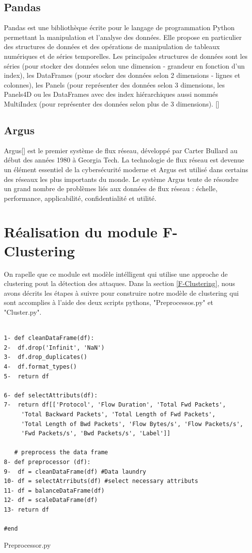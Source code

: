 \subsection{Pandas}
Pandas est une bibliothèque écrite pour le langage de programmation Python permettant la manipulation et l'analyse des données. Elle propose en particulier des structures de données et des opérations de manipulation de tableaux numériques et de séries temporelles. Les principales structures de données sont les séries (pour stocker des données selon une dimension - grandeur en fonction d'un index), les DataFrames (pour stocker des données selon 2 dimensions - lignes et colonnes), les Panels (pour représenter des données selon 3 dimensions, les Panels4D ou les DataFrames avec des index hiérarchiques aussi nommés MultiIndex (pour représenter des données selon plus de 3 dimensions). [\cite{30}]

\subsection{Argus}
Argus[\cite{31}] est le premier système de flux réseau, développé par Carter Bullard au début des années 1980 à Georgia Tech. La technologie de flux réseau est devenue un élément essentiel de la cybersécurité moderne et Argus est utilisé dans certains des réseaux les plus importants du monde. Le système Argus tente de résoudre un grand nombre de problèmes liés aux données de flux réseau : échelle, performance, applicabilité, confidentialité et utilité.\\

\section{Réalisation du module F-Clustering}
On rapelle que ce module est modèle intélligent qui utilise une approche de clustering pout la détection des attaques. Dans la section \ref{F-Clustering}, nous avons décrits les étapes à suivre pour construire notre modèle de clustering qui sont accomplies à l'aide des deux scripts pythons, "Preprocessos.py" et "Cluster.py".
\begin{algorithm}[H]
\begin{verbatim}

1- def cleanDataFrame(df):
2-  df.drop('Infinit', 'NaN')
3-  df.drop_duplicates()
4-  df.format_types()
5-  return df

6- def selectAttributs(df):
7-  return df[['Protocol', 'Flow Duration', 'Total Fwd Packets',
     'Total Backward Packets', 'Total Length of Fwd Packets',	
     'Total Length of Bwd Packets', 'Flow Bytes/s', 'Flow Packets/s', 
     'Fwd Packets/s', 'Bwd Packets/s', 'Label']]
	
   # preprocess the data frame
8- def preprocessor (df): 
9-  df = cleanDataFrame(df) #Data laundry
10- df = selectAtrributs(df) #select necessary attributs 
11- df = balanceDataFrame(df) 
12- df = scaleDataFrame(df)
13- return df

#end
\end{verbatim}
\caption{Preprocessor.py}
\end{algorithm}

